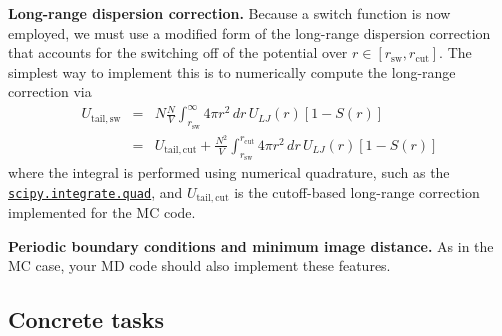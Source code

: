 \documentclass[aip,jcp,preprint,superscriptaddress,floatfix]{revtex4-1}
\begin{document}

\textbf{Long-range dispersion correction.}
Because a switch function is now employed, we must use a modified form of the long-range dispersion correction that accounts for the switching off of the potential over $r \in [r_\mathrm{sw}, r_\mathrm{cut}]$.
The simplest way to implement this is to numerically compute the long-range correction via
\begin{eqnarray}
U_\mathrm{tail,sw} &=& N \frac{N}{V} \int_{r_\mathrm{sw}}^\infty 4 \pi r^2 \, dr \, U_{LJ}(r) [1 - S(r)]  \\
&=& U_\mathrm{tail,cut} + \frac{N^2}{V} \int_{r_\mathrm{sw}}^{r_\mathrm{cut}} 4 \pi r^2 \, dr \, U_{LJ}(r) [1 - S(r)] 
\end{eqnarray}
where the integral is performed using numerical quadrature, such as the \href{https://docs.scipy.org/doc/scipy/reference/generated/scipy.integrate.quad.html}{\tt scipy.integrate.quad}, and $U_\mathrm{tail,cut}$ is the cutoff-based long-range correction implemented for the MC code.

\textbf{Periodic boundary conditions and minimum image distance.} 
As in the MC case, your MD code should also implement these features.

\subsection{Concrete tasks}
\end{document}
